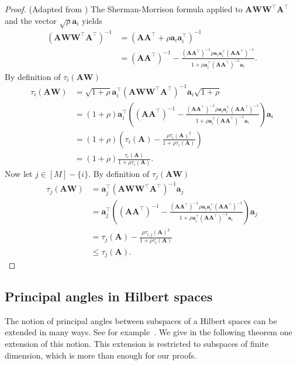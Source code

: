 \documentclass[twoside,11pt]{book}
\numberwithin{theorem}{chapter}
\numberwithin{definition}{chapter}
\numberwithin{proposition}{chapter}
\numberwithin{corollary}{chapter}
\numberwithin{example}{chapter}
\numberwithin{lemma}{chapter}
\numberwithin{assumption}{chapter}
\numberwithin{equation}{chapter}
\numberwithin{figure}{chapter}
\DeclareMathOperator{\Tran}{\intercal}
\begin{document}
\begin{proof}(Adapted from \cite{Coh15})
The Sherman-Morrison formula applied to $\bm{A}\bm{W}\bm{W}^{\Tran}\bm{A}^{\Tran}$ and the vector $\sqrt{\rho} \bm{a}_{i}$ yields
\begin{align}
(\bm{A}\bm{W}\bm{W}^{\Tran}\bm{A}^{\Tran})^{-1} &  = (\bm{A}\bm{A}^{\Tran} + \rho \bm{a}_{i}\bm{a}_{i}^{\Tran})^{-1} \\
& = (\bm{A}\bm{A}^{\Tran})^{-1} - \frac{(\bm{A}\bm{A}^{\Tran})^{-1}\rho \bm{a}_{i}\bm{a}_{i}^{\Tran} (\bm{A}\bm{A}^{\Tran})^{-1}}{1+ \rho \bm{a}_{i}^{\Tran}(\bm{A}\bm{A}^{\Tran})^{-1}\bm{a}_{i}}.
\end{align}
By definition of $\tau_{i}(\bm{A}\bm{W})$
\begin{align}
\tau_{i}(\bm{A}\bm{W}) & = \sqrt{1 + \rho} \bm{a}_{i}^{\Tran}(\bm{A}\bm{W}\bm{W}^{\Tran}\bm{A}^{\Tran})^{-1}\bm{a}_{i}\sqrt{1 + \rho}\\
& = (1+\rho)\bm{a}_{i}^{\Tran} \left( (\bm{A}\bm{A}^{\Tran})^{-1} - \frac{(\bm{A}\bm{A}^{\Tran})^{-1}\rho \bm{a}_{i}\bm{a}_{i}^{\Tran} (\bm{A}\bm{A}^{\Tran})^{-1}}{1+ \rho \bm{a}_{i}^{\Tran}(\bm{A}\bm{A}^{\Tran})^{-1}\bm{a}_{i}} \right) \bm{a}_{i} \nonumber\\
& = (1+\rho) \left(\tau_{i}(\bm{A}) - \frac{\rho \tau_{i}(\bm{A})^{2}}{1+\rho \tau_{i}(\bm{A})} \right) \nonumber\\
& = (1+\rho)\frac{\tau_{i}(\bm{A})}{1+\rho \tau_{i}(\bm{A})} \nonumber.
\end{align}
Now let $j \in [M]-\{i\}$. By definition of $\tau_{j}(\bm{A}\bm{W})$
\begin{align}
\tau_{j}(\bm{A}\bm{W}) & =  \bm{a}_{j}^{\Tran}(\bm{A}\bm{W}\bm{W}^{\Tran}\bm{A}^{\Tran})^{-1}\bm{a}_{j}\\
& = \bm{a}_{j}^{\Tran} \left( (\bm{A}\bm{A}^{\Tran})^{-1} - \frac{(\bm{A}\bm{A}^{\Tran})^{-1}\rho \bm{a}_{i}\bm{a}_{i}^{\Tran} (\bm{A}\bm{A}^{\Tran})^{-1}}{1+ \rho \bm{a}_{i}^{\Tran}(\bm{A}\bm{A}^{\Tran})^{-1}\bm{a}_{i}} \right) \bm{a}_{j} \nonumber\\
& =  \tau_{j}(\bm{A}) - \frac{\rho \tau_{i,j}(\bm{A})^{2}}{1+\rho \tau_{i}(\bm{A})} \nonumber\\
& \leq \tau_{j}(\bm{A}) \nonumber.
\end{align}
\end{proof}



\subsection{Principal angles in Hilbert spaces}\label{sec:proof_principal_angles}
The notion of principal angles between subspaces of a Hilbert spaces can be extended in many ways. See for example~\citep{Deu95}. We give in the following theorem  one extension of this notion. This extension is restricted to subspaces of finite dimension, which is more than enough for our proofs.
\end{document}
